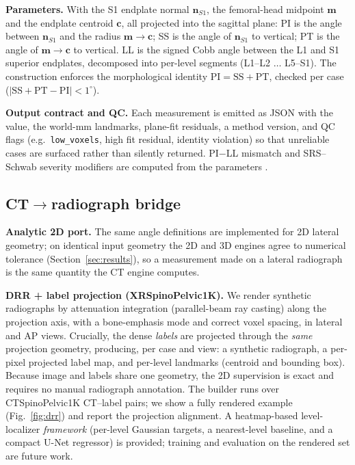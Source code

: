 \documentclass[conference]{IEEEtran}
\newcommand{\dataset}{CTSpinoPelvic1K}
\newcommand{\xrdataset}{XRSpinoPelvic1K}
\begin{document}
\textbf{Parameters.} With the S1 endplate normal $\mathbf{n}_{S1}$, the femoral-head
midpoint $\mathbf{m}$ and the endplate centroid $\mathbf{c}$, all projected into the
sagittal plane:
PI is the angle between $\mathbf{n}_{S1}$ and the radius $\mathbf{m}\!\to\!\mathbf{c}$;
SS is the angle of $\mathbf{n}_{S1}$ to vertical; PT is the angle of
$\mathbf{m}\!\to\!\mathbf{c}$ to vertical. LL is the signed Cobb angle between the L1 and
S1 superior endplates, decomposed into per-level segments (L1--L2 $\ldots$ L5--S1). The
construction enforces the morphological identity $\mathrm{PI}=\mathrm{SS}+\mathrm{PT}$,
checked per case ($|\mathrm{SS}+\mathrm{PT}-\mathrm{PI}|<1^\circ$).

\textbf{Output contract and QC.} Each measurement is emitted as JSON with the value, the
world-mm landmarks, plane-fit residuals, a method version, and QC flags
(e.g.\ \texttt{low\_voxels}, high fit residual, identity violation) so that unreliable
cases are surfaced rather than silently returned. PI$-$LL mismatch and SRS--Schwab
severity modifiers are computed from the parameters \cite{schwab2012}.

\subsection{CT$\rightarrow$radiograph bridge}
\label{sec:bridge}
\textbf{Analytic 2D port.} The same angle definitions are implemented for 2D lateral
geometry; on identical input geometry the 2D and 3D engines agree to numerical tolerance
(Section~\ref{sec:results}), so a measurement made on a lateral radiograph is the same
quantity the CT engine computes.

\textbf{DRR + label projection (\xrdataset).} We render synthetic radiographs by
attenuation integration (parallel-beam ray casting) along the projection axis, with a
bone-emphasis mode and correct voxel spacing, in lateral and AP views. Crucially, the
dense \emph{labels} are projected through the \emph{same} projection geometry, producing,
per case and view: a synthetic radiograph, a per-pixel projected label map, and per-level
landmarks (centroid and bounding box). Because image and labels share one geometry, the
2D supervision is exact and requires no manual radiograph annotation. The builder runs
over \dataset{} CT--label pairs; we show a fully rendered example
(Fig.~\ref{fig:drr}) and report the projection alignment. A heatmap-based level-localizer
\emph{framework} (per-level Gaussian targets, a nearest-level baseline, and a compact
U-Net regressor) is provided; training and evaluation on the rendered set are future work.
\end{document}
